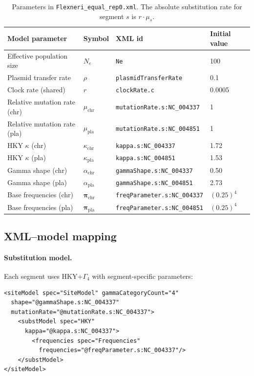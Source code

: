 \documentclass[11pt]{article}
\begin{document}
\begin{table}[H]
\centering
\small
\begin{tabular}{@{} l l l l @{}}
\toprule
\textbf{Model parameter} & \textbf{Symbol} & \textbf{XML id} & \textbf{Initial value} \\
\midrule
Effective population size & $N_e$ & \texttt{Ne} & 100 \\
Plasmid transfer rate & $\rho$ & \texttt{plasmidTransferRate} & 0.1 \\
Clock rate (shared) & $r$ & \texttt{clockRate.c} & 0.0005 \\
Relative mutation rate (chr) & $\mu_{\text{chr}}$ & \texttt{mutationRate.s:NC\_004337} & 1 \\
Relative mutation rate (pla) & $\mu_{\text{pla}}$ & \texttt{mutationRate.s:NC\_004851} & 1 \\
HKY $\kappa$ (chr) & $\kappa_{\text{chr}}$ & \texttt{kappa.s:NC\_004337} & 1.72 \\
HKY $\kappa$ (pla) & $\kappa_{\text{pla}}$ & \texttt{kappa.s:NC\_004851} & 1.53 \\
Gamma shape (chr) & $\alpha_{\text{chr}}$ & \texttt{gammaShape.s:NC\_004337} & 0.50 \\
Gamma shape (pla) & $\alpha_{\text{pla}}$ & \texttt{gammaShape.s:NC\_004851} & 2.73 \\
Base frequencies (chr) & $\boldsymbol{\pi}_{\text{chr}}$ & \texttt{freqParameter.s:NC\_004337} & $(0.25)^4$ \\
Base frequencies (pla) & $\boldsymbol{\pi}_{\text{pla}}$ & \texttt{freqParameter.s:NC\_004851} & $(0.25)^4$ \\
\bottomrule
\end{tabular}
\caption{Parameters in \texttt{Flexneri\_equal\_rep0.xml}. The absolute substitution rate for segment $s$ is $r \cdot \mu_s$.}
\end{table}

\subsection{XML--model mapping}

\noindent\begin{minipage}{\linewidth}
\paragraph{Substitution model.} Each segment uses HKY+$\Gamma_4$ with segment-specific parameters:
\begin{lstlisting}
<siteModel spec="SiteModel" gammaCategoryCount="4"
  shape="@gammaShape.s:NC_004337"
  mutationRate="@mutationRate.s:NC_004337">
    <substModel spec="HKY"
      kappa="@kappa.s:NC_004337">
        <frequencies spec="Frequencies"
          frequencies="@freqParameter.s:NC_004337"/>
    </substModel>
</siteModel>
\end{lstlisting}
\end{minipage}
\end{document}
